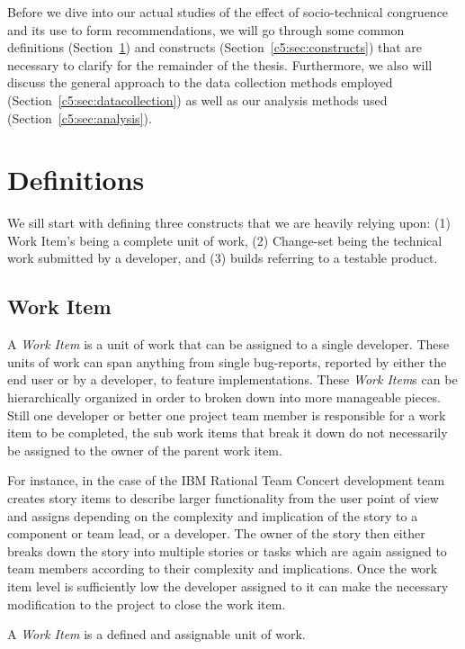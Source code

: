 Before we dive into our actual studies of the effect of socio-technical congruence and its use to form recommendations, we will go through some common definitions (Section~\ref{c5:sec:definitions}) and constructs (Section~\ref{c5:sec:constructs}) that are necessary to clarify for the remainder of the thesis.
Furthermore, we also will discuss the general approach to the data collection methods employed (Section~\ref{c5:sec:datacollection}) as well as our analysis methods used (Section~\ref{c5:sec:analysis}).

\section{Definitions}
\label{c5:sec:definitions}
We sill start with defining three constructs that we are heavily relying upon: (1) Work Item's being a complete unit of work, (2) Change-set being the technical work submitted by a developer, and (3) builds referring to a testable product.

\subsection{Work Item}
A \emph{Work Item} is a unit of work that can be assigned to a single developer.
These units of work can span anything from single bug-reports, reported by either the end user or by a developer, to feature implementations.
These \emph{Work Item}s can be hierarchically organized in order to broken down into more manageable pieces.
Still one developer or better one project team member is responsible for a work item to be completed, the sub work items that break it down do not necessarily be assigned to the owner of the parent work item.

For instance, in the case of the IBM Rational Team Concert development team creates story items to describe larger functionality from the user point of view and assigns depending on the complexity and implication of the story to a component or team lead, or a developer.
The owner of the story then either breaks down the story into multiple stories or tasks which are again assigned to team members according to their complexity and implications.
Once the work item level is sufficiently low the developer assigned to it can make the necessary modification to the project to close the work item.

\begin{note}
\begin{mydef}
A \emph{Work Item} is a defined and assignable unit of work.
\end{mydef}
\end{note} 

